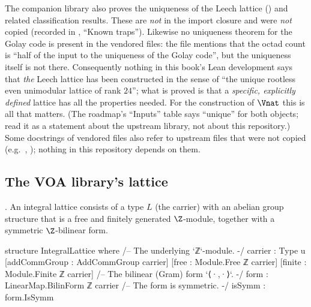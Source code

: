 \begin{warning}[title={Trap: what was \emph{not} vendored}]\label{ch02:warn:uniqueness}
The companion library also proves the uniqueness of the Leech lattice () and
related classification results.  These are \emph{not} in the import closure and were \emph{not}
copied (recorded in , ``Known traps'').  Likewise no uniqueness
theorem for the Golay code is present in the vendored files: the file
 mentions that the octad count is ``half of the input to the
uniqueness of the Golay code'', but the uniqueness itself is not there.  Consequently nothing in
this book's Lean development says that \emph{the} Leech lattice has been constructed in the sense
of ``the unique rootless even unimodular lattice of rank $24$''; what is proved is that a
\emph{specific, explicitly defined} lattice  has all the properties needed.
For the construction of $\Vnat$ this is all that matters.  (The roadmap's ``Inputs'' table says
``unique'' for both objects; read it as a statement about the upstream library, not about this
repository.)  Some docstrings of vendored files also refer to upstream files that were not copied
(e.g.\ , );
nothing in this repository depends on them.
\end{warning}

\subsection{The VOA library's lattice}\label{ch02:sec:voalattice}

\begin{definition}\label{ch02:def:voalattice}
.  An integral lattice consists of a type $L$ (the
carrier) with an abelian group structure that is a free and finitely generated $\Z$-module,
together with a symmetric $\Z$-bilinear form.
\end{definition}
\begin{leancode}
structure IntegralLattice where
  /-- The underlying `ℤ`-module. -/
  carrier : Type u
  [addCommGroup : AddCommGroup carrier]
  [free : Module.Free ℤ carrier]
  [finite : Module.Finite ℤ carrier]
  /-- The bilinear (Gram) form `⟨·,·⟩`. -/
  form : LinearMap.BilinForm ℤ carrier
  /-- The form is symmetric. -/
  isSymm : form.IsSymm
\end{leancode}


